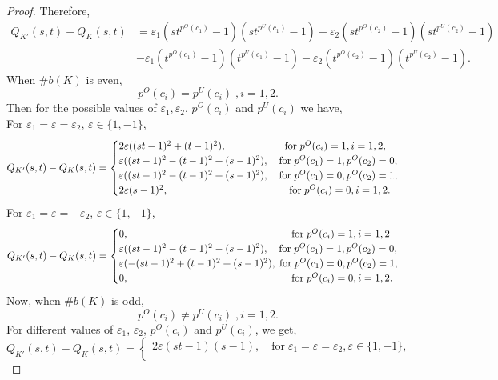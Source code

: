 \documentclass[10pt,a4paper,reqno]{amsart}
\theoremstyle{definition}
\theoremstyle{remark}
\begin{document}
\begin{proof}
		Therefore, \begin{align*}
			Q_{K'}(s,t)-Q_{K}(s,t) &=\varepsilon_{1}(st^{p^{O}(c_{1})}-1)(st^{p^{U}(c_{1})}-1)+\varepsilon_{2}(st^{p^{O}(c_{2})}-1)(st^{p^{U}(c_{2})}-1)\\ &-\varepsilon_{1}(t^{p^{O}(c_{1})}-1)(t^{p^{U}(c_{1})}-1)-\varepsilon_{2}(t^{p^{O}(c_{2})}-1)(t^{p^{U}(c_{2})}-1).
		\end{align*}
		When $\# b(K)$ is even, \[p^{O}(c_i)=p^{U}(c_i)\; , i=1,2.\]
		Then for the possible values of $\varepsilon_{1}, \varepsilon_{2}$, $p^{O}(c_i)$ and  $p^{U}(c_i)$ we have,\\
		For $\varepsilon_{1}=\varepsilon=\varepsilon_{2}$, $\varepsilon \in \{1,-1\}$,  \\
		$$Q_{K'}(s,t)-Q_{K}(s,t)
		=\begin{cases}
			2\varepsilon((st-1)^{2}+(t-1)^{2}), \hspace{2cm} \text{for} \; p^{O}(c_i)=1, i=1,2,\\
			\varepsilon((st-1)^{2}-(t-1)^{2}+(s-1)^{2}) , \quad \text{for} \; p^{O}(c_1)=1, p^{O}(c_2)=0,\\
			\varepsilon((st-1)^{2}-(t-1)^{2}+(s-1)^{2}), \quad \text{for} \; p^{O}(c_1)=0, p^{O}(c_2)=1,\\
			2\varepsilon(s-1)^{2}, \hspace{4.15cm} \text{for} \; p^{O}(c_i)=0, i=1,2.
		\end{cases}
		$$
		For $\varepsilon_{1}=\varepsilon=-\varepsilon_{2}$, $\varepsilon \in \{1,-1\}$,  \\
		$$Q_{K'}(s,t)-Q_{K}(s,t)
		=\begin{cases}
			0, \hspace{5.6cm} \text{for} \; p^{O}(c_i)=1, i=1,2\\
			\varepsilon((st-1)^{2}-(t-1)^{2}-(s-1)^{2}) , \quad \text{for} \; p^{O}(c_1)=1, p^{O}(c_2)=0,\\
			\varepsilon(-(st-1)^{2}+(t-1)^{2}+(s-1)^{2}), \; \text{for} \; p^{O}(c_1)=0, p^{O}(c_2)=1,\\
			0, \hspace{5.6cm} \text{for} \; p^{O}(c_i)=0, i=1,2.
		\end{cases}
		$$
		Now, when $\# b(K)$ is odd,
		\[p^{O}(c_i)\neq p^{U}(c_i)\; , i=1,2.\]
		For different values of $\varepsilon_{1}$, $\varepsilon_{2}$, $p^{O}(c_i)$ and  $p^{U}(c_i)$, we  get,
		$$Q_{K'}(s,t)-Q_{K}(s,t)=\begin{cases}
			2\varepsilon(st-1)(s-1),  \quad \text{for} \; \varepsilon_{1}=\varepsilon=\varepsilon_{2}, \varepsilon \in \{1,-1\},\\

\end{cases}$$
\end{proof}
\end{document}
